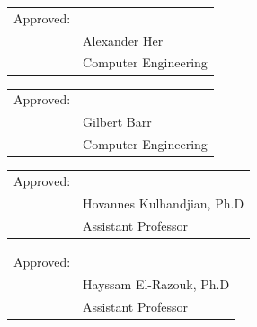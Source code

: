 \documentclass[12pt,onecolumn]{IEEEtran}			%
\begin{document}
\begin{tabular}{@{}p{.5in}p{4in}@{}}
Approved: & \hrulefill \\
& Alexander Her \\
& Computer Engineering\\
\end{tabular}
\vspace{12pt} 

\begin{tabular}{@{}p{.5in}p{4in}@{}}
Approved: & \hrulefill \\
& Gilbert Barr \\
& Computer Engineering\\
\end{tabular}
\vspace{12pt} 

\begin{tabular}{@{}p{.5in}p{4in}@{}}
Approved: & \hrulefill \\
& Hovannes Kulhandjian, Ph.D \\
& Assistant Professor\\
\end{tabular}
\vspace{12pt} 

\begin{tabular}{@{}p{.5in}p{4in}@{}}
Approved: & \hrulefill \\
& Hayssam El-Razouk, Ph.D \\
& Assistant Professor\\
\end{tabular}


\newpage
~\cite{lu2018survey}
~\cite{mishra2019introduction}
~\cite{shanmugamani2018deep}


 
\end{document}
